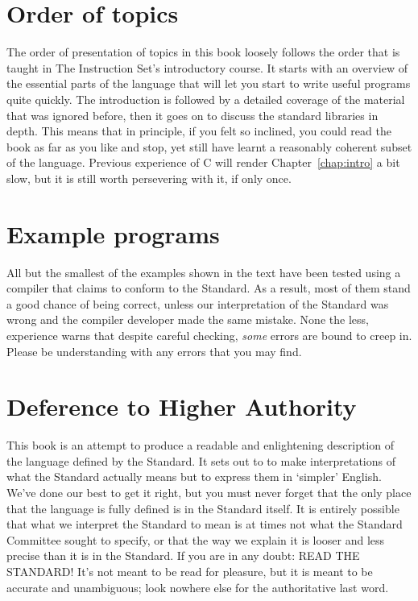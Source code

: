  
        \section*{Order of topics}
        

  

  The order of presentation of topics in this book loosely follows the
   order that is taught in The Instruction Set's introductory course. It
   starts with an overview of the essential parts of the language that will
   let you start to write useful programs quite quickly. The introduction is
   followed by a detailed coverage of the material that was ignored before,
   then it goes on to discuss the standard libraries in depth. This means that
   in principle, if you felt so inclined, you could read the book as far as
   you like and stop, yet still have learnt a reasonably coherent subset of
   the language. Previous experience of C will render Chapter~\ref{chap:intro}
   a bit slow, but it is still worth persevering with it, if only once.


 
        \section*{Example programs}
        

  

  All but the smallest of the examples shown in the text have been tested
   using a compiler that claims to conform to the Standard. As a result, most
   of them stand a good chance of being correct, unless our interpretation of
   the Standard was wrong and the compiler developer made the same mistake.
   None the less, experience warns that despite careful checking,
   \textit{some} errors are bound to creep in. Please be understanding with
   any errors that you may find.


 
        \section*{Deference to Higher Authority}
        

  

  This book is an attempt to produce a readable and enlightening
   description of the language defined by the Standard. It sets out to to make
   interpretations of what the Standard actually means but to express them in
   `simpler' English. We've done our best to get it right, but you must
   never forget that the only place that the language is fully defined is in
   the Standard itself. It is entirely possible that what we interpret the
   Standard to mean is at times not what the Standard Committee sought to
   specify, or that the way we explain it is looser and less precise than it
   is in the Standard. If you are in any doubt: READ THE STANDARD! It's not
   meant to be read for pleasure, but it is meant to be accurate and
   unambiguous; look nowhere else for the authoritative last word.


